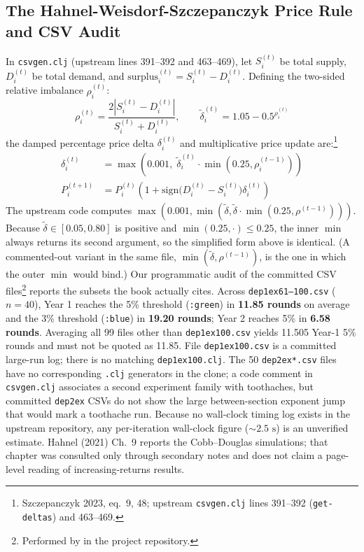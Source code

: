 \documentclass[10pt,twoside,openany]{book}
\theoremstyle{dpepstyle}
\begin{document}
\subsection{The Hahnel-Weisdorf-Szczepanczyk Price Rule and CSV Audit}
In \texttt{csvgen.clj} (upstream lines 391--392 and 463--469), let $S_i^{(t)}$ be total supply, $D_i^{(t)}$ be total demand, and $\text{surplus}_i^{(t)} = S_i^{(t)} - D_i^{(t)}$. Defining the two-sided relative imbalance $\rho_i^{(t)}$:
\begin{equation}
  \rho_i^{(t)} = \frac{2 \left| S_i^{(t)} - D_i^{(t)} \right|}{S_i^{(t)} + D_i^{(t)}}, \qquad \tilde{\delta}_i^{(t)} = 1.05 - 0.5^{\rho_i^{(t)}}
\end{equation}
the damped percentage price delta $\delta_i^{(t)}$ and multiplicative price update are:\footnote{Szczepanczyk 2023, eq.~9, 48; upstream \texttt{csvgen.clj} lines 391--392 (\texttt{get-deltas}) and 463--469.}
\begin{align}
  \delta_i^{(t)} &= \max\left(0.001, \; \tilde{\delta}_i^{(t)} \cdot \min\left(0.25, \rho_i^{(t-1)}\right)\right) \nonumber \\
  P_i^{(t+1)} &= P_i^{(t)} \left(1 + \text{sign}\big(D_i^{(t)} - S_i^{(t)}\big)\delta_i^{(t)}\right) \label{eq:pequod-rule}
\end{align}
The upstream code computes $\max(0.001, \min(\tilde\delta, \tilde\delta \cdot \min(0.25,\rho^{(t-1)})))$. Because $\tilde\delta \in [0.05, 0.80]$ is positive and $\min(0.25,\cdot) \le 0.25$, the inner $\min$ always returns its second argument, so the simplified form above is identical. (A commented-out variant in the same file, $\min(\tilde\delta, \rho^{(t-1)})$, is the one in which the outer $\min$ would bind.)
Our programmatic audit of the committed CSV files\footnote{Performed by  in the project repository.} reports the subsets the book actually cites. Across \texttt{dep1ex61--100.csv} ($n=40$), Year 1 reaches the 5\% threshold (\texttt{:green}) in \textbf{11.85 rounds} on average and the 3\% threshold (\texttt{:blue}) in \textbf{19.20 rounds}; Year 2 reaches 5\% in \textbf{6.58 rounds}. Averaging all 99 files other than \texttt{dep1ex100.csv} yields 11.505 Year-1 5\% rounds and must not be quoted as 11.85. File \texttt{dep1ex100.csv} is a committed large-run log; there is no matching \texttt{dep1ex100.clj}. The 50 \texttt{dep2ex*.csv} files have no corresponding \texttt{.clj} generators in the clone; a code comment in \texttt{csvgen.clj} associates a second experiment family with toothaches, but committed \texttt{dep2ex} CSVs do not show the large between-section exponent jump that would mark a toothache run. Because no wall-clock timing log exists in the upstream repository, any per-iteration wall-clock figure ($\sim 2.5\text{ s}$) is an unverified estimate. Hahnel (2021) Ch.~9 reports the Cobb--Douglas simulations; that chapter was consulted only through secondary notes and does not claim a page-level reading of increasing-returns results.
\end{document}
